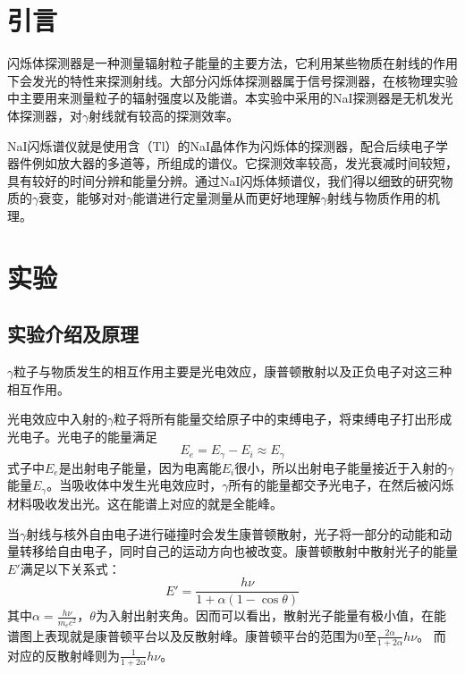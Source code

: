 \documentclass[a4paper,10.0pt,twoside]{npr}
\begin{document}
\begin{multicols}{2}

\section{引言}    %
\vspace*{-1mm}
\song\wuhao
闪烁体探测器是一种测量辐射粒子能量的主要方法，它利用某些物质在射线的作用下会发光的特性来探测射线。大部分闪烁体探测器属于信号探测器，在核物理实验中主要用来测量粒子的辐射强度以及能谱。本实验中采用的NaI探测器是无机发光体探测器，对$\gamma$射线就有较高的探测效率。

NaI闪烁谱仪就是使用含（Tl）的NaI晶体作为闪烁体的探测器，配合后续电子学器件例如放大器的多道等，所组成的谱仪。它探测效率较高，发光衰减时间较短，具有较好的时间分辨和能量分辨。通过NaI闪烁体频谱仪，我们得以细致的研究物质的$\gamma$衰变，能够对对$\gamma$能谱进行定量测量从而更好地理解$\gamma$射线与物质作用的机理。
\section{实验}
\subsection{实验介绍及原理}
$\gamma$粒子与物质发生的相互作用主要是光电效应，康普顿散射以及正负电子对这三种相互作用。

光电效应中入射的$\gamma$粒子将所有能量交给原子中的束缚电子，将束缚电子打出形成光电子。光电子的能量满足
\begin{equation}
   E_{e}= E_\gamma - E_i \approx E_\gamma
\end{equation}
式子中$E_{e}$是出射电子能量，因为电离能$E_i$很小，所以出射电子能量接近于入射的$\gamma$能量$E_\gamma$。当吸收体中发生光电效应时，$\gamma$所有的能量都交予光电子，在然后被闪烁材料吸收发出光。这在能谱上对应的就是全能峰。

当$\gamma$射线与核外自由电子进行碰撞时会发生康普顿散射，光子将一部分的动能和动量转移给自由电子，同时自己的运动方向也被改变。康普顿散射中散射光子的能量$E'$满足以下关系式：
\begin{equation}
   E'=\frac{h\nu}{1+\alpha(1-\cos{\theta})}
\end{equation}
其中$\alpha = \frac{h\nu}{m_e c^2}$，$\theta$为入射出射夹角。因而可以看出，散射光子能量有极小值，在能谱图上表现就是康普顿平台以及反散射峰。康普顿平台的范围为0至$\frac{2\alpha}{1+2\alpha}h\nu$。 而对应的反散射峰则为$\frac{1}{1+2\alpha}h\nu$。


\end{multicols}
\end{document}
